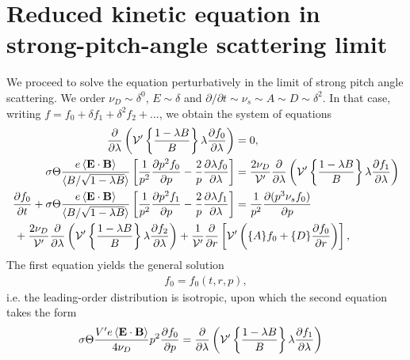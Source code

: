 \documentclass[11pt,a4paper]{article}
\renewcommand{\b}[1]{\ensuremath{ {\bf #1 } }}
\begin{document}
\section{Reduced kinetic equation in strong-pitch-angle scattering limit}
We proceed to solve the equation perturbatively in the limit of strong pitch angle scattering. We order $\nu_D \sim \delta^0$, $E \sim \delta$ and $\partial/\partial t \sim \nu_s \sim A \sim D \sim \delta^2$. In that case, writing $f=f_0+\delta f_1+\delta^2 f_2 + ...$, we obtain the system of equations
\begin{align}
\frac{\partial}{\partial \lambda}\left(  \mathcal{V'}\left\{\frac{1-\lambda B}{B}\right\} \lambda\frac{\partial f_0}{\partial \lambda}\right) &= 0, \\
\sigma \Theta \frac{e \left\langle \b{E}\cdot\b{B}\right\rangle}{\langle B/\sqrt{1-\lambda B} \rangle}\left[\frac{1}{p^2}\frac{\partial p^2 f_0}{\partial p}  - \frac{2}{p}\frac{\partial \lambda f_0}{\partial \lambda}\right] &=  \frac{2\nu_D}{\mathcal{V}'}\frac{\partial}{\partial \lambda}\left(  \mathcal{V'}\left\{\frac{1-\lambda B}{B}\right\} \lambda\frac{\partial f_1}{\partial \lambda}\right) \\
%
\frac{\partial f_0}{\partial t} + \sigma \Theta \frac{e \left\langle \b{E}\cdot\b{B}\right\rangle}{\langle B/\sqrt{1-\lambda B} \rangle}\left[\frac{1}{p^2}\frac{\partial p^2 f_1}{\partial p}  - \frac{2}{p}\frac{\partial \lambda f_1}{\partial \lambda}\right]  &= \frac{1}{p^2}\frac{\partial(p^3 \nu_s f_0)}{\partial p} \nonumber \\
&\hspace{-70mm}+ \frac{2\nu_D}{\mathcal{V}'}\frac{\partial}{\partial \lambda}\left(  \mathcal{V'}\left\{\frac{1-\lambda B}{B}\right\} \lambda\frac{\partial f_2}{\partial \lambda}\right)+\frac{1}{\mathcal{V}'}\frac{\partial}{\partial r}\left[ \mathcal{V'}\left(\{A\}f_0+ \{D\}\frac{\partial f_0}{\partial r} \right) \right],
\end{align}
The first equation yields the general solution
\begin{align}
f_0 = f_0(t,r,p),
\end{align}
i.e. the leading-order distribution is isotropic, upon which the second equation takes the form
\begin{align}
\sigma \Theta \frac{V'e \left\langle \b{E}\cdot\b{B}\right\rangle}{4\nu_D}p^2\frac{\partial  f_0}{\partial p} &=  \frac{\partial}{\partial \lambda}\left(  \mathcal{V'}\left\{\frac{1-\lambda B}{B}\right\} \lambda\frac{\partial f_1}{\partial \lambda}\right) 
\end{align}
\end{document}
